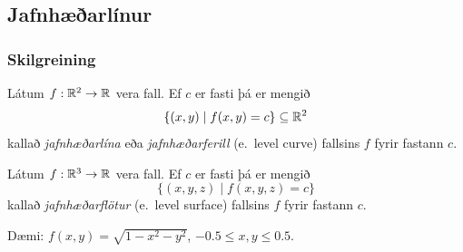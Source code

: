 \begin{figure} [h]
\begin {center}  \end {center}
\end {figure}  



\subsection{Jafnhæðarlínur}
 \subsubsection {Skilgreining }
  Látum $f:{\mathbb R}^2\rightarrow {\mathbb R}$ vera fall.  Ef $c$ er fasti þá er mengið 
$$\{(x,y)\mid f(x,y)=c\}\subseteq {\mathbb R}^2$$
kallað {\em jafnhæðarlína} eða {\em jafnhæðarferill} (e.~level curve) fallsins $f$ fyrir fastann $c$.

 Látum $f:{\mathbb R}^3\rightarrow {\mathbb R}$ vera fall.  Ef $c$ er fasti þá er mengið 
$$\{(x,y,z)\mid f(x,y,z)=c\}$$
kallað {\em jafnhæðarflötur} (e.~level surface)  
fallsins $f$ fyrir fastann $c$.
 


 Dæmi: $f(x,y) = \sqrt{1-x^2-y^2}$, $-0.5\leq x,y\leq 0.5$.         

